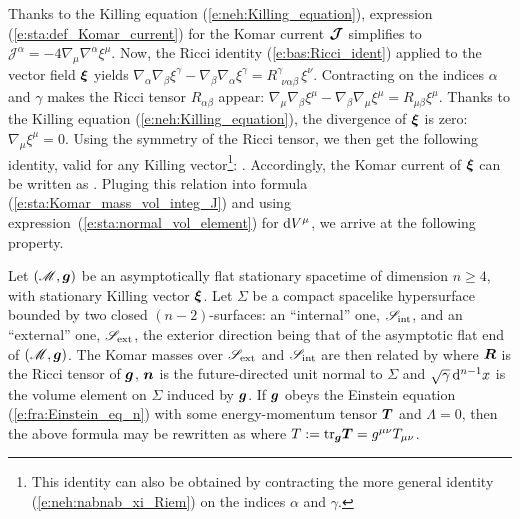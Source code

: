 Thanks to the Killing equation (\ref{e:neh:Killing_equation}),
expression (\ref{e:sta:def_Komar_current}) for the Komar current $\bm{\mathcal{J}}$
simplifies to  $\mathcal{J}^\alpha = - 4 \nabla_\mu \nabla^\alpha \xi^\mu$.
Now, the Ricci identity (\ref{e:bas:Ricci_ident})
applied to the vector field $\bm{\xi}$ yields
$\nabla_\alpha \nabla_\beta \xi^\gamma - \nabla_\beta \nabla_\alpha \xi^\gamma
= R^\gamma_{\ \  \nu \alpha\beta} \, \xi^\nu$. Contracting on the indices
$\alpha$ and $\gamma$ makes the Ricci tensor $R_{\alpha\beta}$ appear:
$\nabla_\mu \nabla_\beta \xi^\mu - \nabla_\beta \nabla_\mu \xi^\mu = R_{\mu\beta} \xi^\mu$.
Thanks to the Killing equation (\ref{e:neh:Killing_equation}), the divergence
of $\bm{\xi}$ is zero: $\nabla_\mu \xi^\mu = 0$. Using the symmetry of the Ricci tensor,
we then get the following identity, valid for any Killing vector\footnote{This identity
can also be obtained by contracting the more general identity (\ref{e:neh:nabnab_xi_Riem})
on the indices $\alpha$ and $\gamma$.}:
\be
     .
\ee
Accordingly, the Komar current of $\bm{\xi}$ can be written as
\be \label{e:sta:J_Killing_Ricci}
     .
\ee
Pluging this relation into formula (\ref{e:sta:Komar_mass_vol_integ_J})
and using expression~(\ref{e:sta:normal_vol_element}) for $\mathrm{d} V^\mu$,
we arrive at the following property.

\begin{prop}
\label{p:sta:Komar_mass_vol_integ}
Let $(\mathscr{M}, \bm{g})$ be an asymptotically flat stationary spacetime of dimension $n\geq 4$,
with stationary Killing vector $\bm{\xi}$.
Let $\Sigma$ be a compact spacelike hypersurface bounded by two closed $(n-2)$-surfaces:
an ``internal'' one, $\mathscr{S}_{\rm int}$, and an ``external'' one,
$\mathscr{S}_{\rm ext}$, the exterior direction being that of the asymptotic flat end of $(\mathscr{M}, \bm{g})$.
The Komar masses over $\mathscr{S}_{\rm ext}$ and $\mathscr{S}_{\rm int}$ are then
related by
\be \label{e:sta:Komar_mass_vol_integ_R}
\ee
where $\bm{R}$ is the Ricci tensor of $\bm{g}$,
$\bm{n}$ is the future-directed unit normal to $\Sigma$
and $\sqrt{\gamma}\,\mathrm{d}^{n-1} x$ is the volume element on $\Sigma$
induced by $\bm{g}$.
If $\bm{g}$ obeys the Einstein equation (\ref{e:fra:Einstein_eq_n}) with some energy-momentum
tensor $\bm{T}$ and $\Lambda=0$, then
the above formula may be rewritten as
\be \label{e:sta:Komar_mass_vol_integ}
\ee
where $T:= \mathrm{tr}_{\bm{g}} \bm{T} = g^{\mu\nu} T_{\mu\nu}$.
\end{prop}

